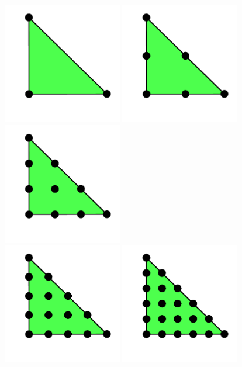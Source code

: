 \begin{figure}
  \begin{center}
    \includegraphics[width=5.2cm]{chapters/kirby-6/png/CG1_2d.png}
    \includegraphics[width=5.2cm]{chapters/kirby-6/png/CG2_2d.png}
    \includegraphics[width=5.2cm]{chapters/kirby-6/png/CG3_2d.png} \\
    \includegraphics[width=5.2cm]{chapters/kirby-6/png/CG4_2d.png}
    \includegraphics[width=5.2cm]{chapters/kirby-6/png/CG5_2d.png}

\end{center}
\end{figure}
